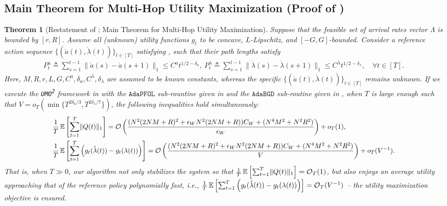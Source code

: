 \documentclass[11pt,fullpage,letterpaper]{article} %
\newtheorem{theorem}{Theorem}[section]
\renewcommand{\bm}[1]{#1}%
\renewcommand{\O}{\operatorname{\mathcal O}}
\newcommand{\E}{\operatornamewithlimits{\mathbb{E}}}
\newcommand{\UMAlg}{\texttt{UMO}\textsuperscript{\texttt{2}}\xspace}
\newcommand{\OLOAlg}{\texttt{AdaPFOL}\xspace}
\newcommand{\BCOAlg}{\texttt{AdaBGD}\xspace}
\newcommand{\OLO}{\OLOAlg}
\newcommand{\BCO}{\BCOAlg}
\newcommand\scalemath[2]{\scalebox{#1}{\mbox{\ensuremath{\displaystyle #2}}}}
\begin{document}
\subsection{Main Theorem for Multi-Hop Utility Maximization (Proof of )}\label{sec:multi-hop utility appendix}
\begin{theorem}[Restatement of ; Main Theorem for Multi-Hop Utility Maximization]
Suppose that the feasible set of arrival rates vector $\Lambda$ is bounded by $[r,R]$.
Assume all (unknown) utility functions $g_t$ to be concave, $L$-Lipschitz, and $[-G,G]$-bounded.
Consider a reference action sequence $\{(\mathring{\bm a}(t),\mathring{\bm \lambda}(t))\}_{t\in [T]}$ satisfying , such that their path lengths satisfy
\begin{align*}
P_t^a\triangleq \sum_{s=1}^{t-1} \lVert \mathring{\bm a}(s)-\mathring{\bm a}(s+1)\rVert_1\le C^a t^{1/2-\delta_a},~P_t^\lambda\triangleq \sum_{s=1}^{t-1} \lVert \mathring{\bm \lambda}(s)-\mathring{\bm \lambda}(s+1)\rVert_1\le C^\lambda t^{1/2 - \delta_\lambda},\quad \forall t\in [T].
\end{align*}
Here, $M,R,r,L,G,C^a,\delta_a,C^\lambda,\delta_\lambda$ are assumed to be known constants, whereas the specific $\{(\mathring{\bm a}(t),\mathring{\bm \lambda}(t))\}_{t\in [T]}$ remains unknown.
If we execute the \UMAlg framework in  with the $\OLO$ sub-rountine given in  and the $\BCO$ sub-routine given in , when $T$ is large enough such that $V=o_T(\min\{T^{2\delta_a/3},T^{2\delta_\lambda/7}\})$, the following inequalities hold simultaneously:
\begin{align*}
&\scalemath{0.95}{\frac 1T \E\left [\sum_{t=1}^T \lVert \bm Q(t)\rVert_1\right ]=\O\left (\frac{(N^2 (2NM+R)^2 + \epsilon_W N^2 (2NM+R)) C_W + (N^4 M^2+N^2 R^2)}{\epsilon_W}\right ) + o_T(1),}\\
&\scalemath{0.95}{\frac 1T \E\left [\sum_{t=1}^T \left (g_{t}(\mathring{\bm \lambda}(t)) - g_{t}(\bm \lambda(t))\right )\right ]=\O\left (\frac{(N^2 (2NM+R)^2 + \epsilon_W N^2 (2NM+R)) C_W + (N^4 M^2+N^2 R^2)}{V}\right ) + o_T(V^{-1}).}
\end{align*}
That is, when $T\gg 0$, our algorithm not only stabilizes the system so that $\frac 1T \E\left [\sum_{t=1}^T \lVert \bm Q(t)\rVert_1\right ]=\O_T(1)$, but also enjoys an average utility approaching that of the reference policy polynomially fast, \textit{i.e.}, $\frac 1T \E\left [\sum_{t=1}^T \left (g_{t}(\mathring{\bm \lambda}(t)) - g_{t}(\bm \lambda(t))\right )\right ]=\O_T(V^{-1})$ -- the utility maximization objective  is ensured.
\end{theorem}
\end{document}
